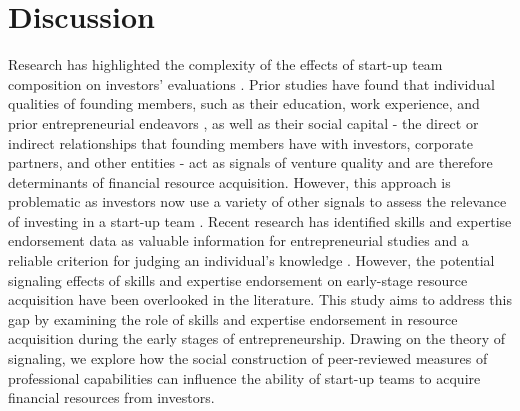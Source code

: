 \documentclass[12pt]{article}
\begin{document}
\section{Discussion}

Research has highlighted the complexity of the effects of start-up team composition on investors' evaluations \citep{cooper1994initial, ghassemiautomated}. Prior studies have found that individual qualities of founding members, such as their education, work experience, and prior entrepreneurial endeavors \citep{shane2002network, hsu2007experienced}, as well as their social capital - the direct or indirect relationships that founding members have with investors, corporate partners, and other entities \citep{shane2002network, hsu2007experienced, huang2017resources} - act as signals of venture quality and are therefore determinants of financial resource acquisition. However, this approach is problematic as investors now use a variety of other signals to assess the relevance of investing in a start-up team \citep{banerji2019startup, mollick2014dynamics, courtney2017resolving}. Recent research has identified skills and expertise endorsement data \citep{perez2016endorsement, wu2018analysis} as valuable information for entrepreneurial studies and a reliable criterion for judging an individual's knowledge \citep{rapanta2017linkedin, reese2020should, sako2020scaling}. However, the potential signaling effects of skills and expertise endorsement on early-stage resource acquisition have been overlooked in the literature. This study aims to address this gap by examining the role of skills and expertise endorsement in resource acquisition during the early stages of entrepreneurship. Drawing on the theory of signaling, we explore how the social construction of peer-reviewed measures of professional capabilities can influence the ability of start-up teams to acquire financial resources from investors.
\end{document}
